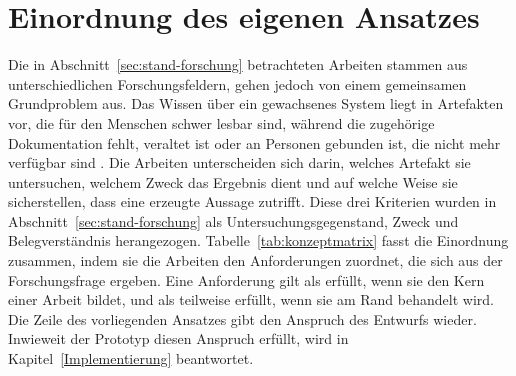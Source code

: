 \section{Einordnung des eigenen Ansatzes}
\label{sec:forschungsluecke}

Die in Abschnitt~\ref{sec:stand-forschung} betrachteten Arbeiten stammen aus unterschiedlichen Forschungsfeldern, gehen jedoch von einem gemeinsamen Grundproblem aus. Das Wissen über ein gewachsenes System liegt in Artefakten vor, die für den Menschen schwer lesbar sind, während die zugehörige Dokumentation fehlt, veraltet ist oder an Personen gebunden ist, die nicht mehr verfügbar sind \cite{diggs_leveraging_2024, latreche_llm-assisted_2026, helwig_metadata_2026}. Die Arbeiten unterscheiden sich darin, welches Artefakt sie untersuchen, welchem Zweck das Ergebnis dient und auf welche Weise sie sicherstellen, dass eine erzeugte Aussage zutrifft. Diese drei Kriterien wurden in Abschnitt~\ref{sec:stand-forschung} als Untersuchungsgegenstand, Zweck und Belegverständnis herangezogen. Tabelle~\ref{tab:konzeptmatrix} fasst die Einordnung zusammen, indem sie die Arbeiten den Anforderungen zuordnet, die sich aus der Forschungsfrage ergeben. Eine Anforderung gilt als erfüllt, wenn sie den Kern einer Arbeit bildet, und als teilweise erfüllt, wenn sie am Rand behandelt wird. Die Zeile des vorliegenden Ansatzes gibt den Anspruch des Entwurfs wieder. Inwieweit der Prototyp diesen Anspruch erfüllt, wird in Kapitel~\ref{Implementierung} beantwortet.

